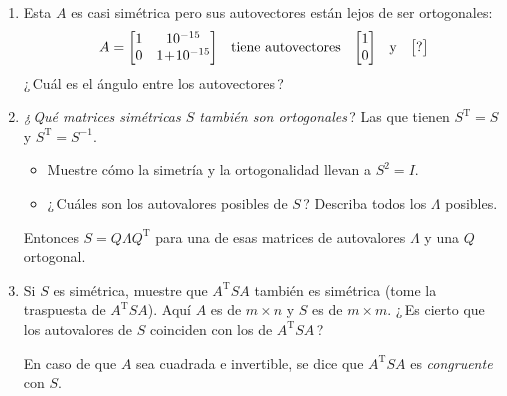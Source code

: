 \documentclass[12pt,a4paper]{article}
\newcommand\1{\mbox{\,\vrule height-0.8pt depth1.0pt width2pc\,}}
\newcommand\2{\mbox{\,\vrule height-0.8pt depth1.0pt width1pc\,}}
\DeclareRobustCommand\transp{^{\mathrm{T}}}
\newcommand{\La}{\Lambda}
\begin{document}
\begin{enumerate}
\item Esta $A$ es casi simétrica pero sus autovectores están lejos de ser ortogonales:
%
  $$ A=\begin{bmatrix}1 & 10^{-15}\\
  0 & 1\! +\!  10^{-15}
    \end{bmatrix}\quad \hbox{tiene autovectores}\quad
  \begin{bmatrix}1\\0\end{bmatrix}\quad \hbox{y}\quad
  \begin{bmatrix}?\end{bmatrix}
$$
%
¿\,Cuál es el ángulo entre los autovectores\,?

\item \emph{¿\,Qué matrices simétricas $S$ también son ortogonales}\,? Las que tienen $S\transp=S$ y $S\transp=S^{-1}$.
\begin{itemize}
\item[(a)] Muestre cómo la simetría y la ortogonalidad llevan a $S^2=I$.
\item[(b)] ¿\,Cuáles son los autovalores posibles de $S$\,? Describa todos los $\Lambda$ posibles.
\end{itemize}
Entonces $S=Q\La Q\transp$ para una de esas matrices de autovalores $\La$ y una $Q$ ortogonal.
\item Si $S$ es simétrica, muestre que $A\transp SA$ también es simétrica (tome la traspuesta de $A\transp SA$). Aquí $A$ es de $m \times n$ y $S$ es de $m\times m$. ¿\,Es cierto que los autovalores de $S$ coinciden con los de $A\transp SA$\,?

\vspace{5pt}
\quad\; En caso de que $A$ sea cuadrada e invertible, se dice que $A\transp SA$ es \emph{congruente}  con $S$.


\end{enumerate}
\end{document}
